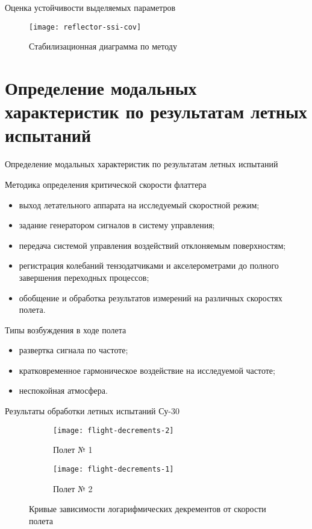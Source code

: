 \begin{frame}{Оценка устойчивости выделяемых параметров}
	\begin{figure}
		\centering
		\texttt{[image: reflector-ssi-cov]}
		\caption{Стабилизационная диаграмма по методу }
	\end{figure}
\end{frame}

\section{Определение модальных характеристик по результатам летных испытаний}

\begin{frame}{Определение модальных характеристик по результатам летных испытаний}
	\begin{block}{Методика определения критической скорости флаттера}
		\begin{itemize}
			\item выход летательного аппарата на исследуемый скоростной режим;
			\item задание генератором сигналов в систему управления; 
			\item передача системой управления воздействий отклоняемым поверхностям;
			\item регистрация колебаний тензодатчиками и акселерометрами до полного завершения переходных процессов;
			\item обобщение и обработка результатов измерений на различных скоростях полета.
		\end{itemize}
	\end{block}
	\begin{block}{Типы возбуждения в ходе полета}
		\begin{itemize}
			\item развертка сигнала по частоте; 
			\item кратковременное гармоническое воздействие на исследуемой частоте; 
			\item неспокойная атмосфера.
		\end{itemize}
	\end{block}
\end{frame}

\begin{frame}{Результаты обработки летных испытаний Су-30}
	\begin{figure}
		\begin{subfigure}[b]{0.49\textwidth}
			\centering
	     	\texttt{[image: flight-decrements-2]} 
	     	\caption{Полет № 1}
	    \end{subfigure}
    	\hfill
	    \begin{subfigure}[b]{0.49\textwidth}
			\centering
			\texttt{[image: flight-decrements-1]}
			\caption{Полет № 2}
	    \end{subfigure}
    	\caption{Кривые зависимости логарифмических декрементов от скорости полета}
	\end{figure}
\end{frame}

